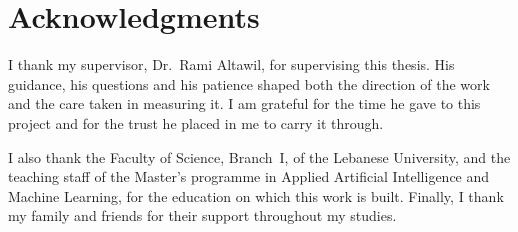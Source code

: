 \chapter*{Acknowledgments}

I thank my supervisor, Dr.~Rami Altawil, for supervising this thesis. His guidance, his questions and his
patience shaped both the direction of the work and the care taken in measuring it. I am grateful for the time he gave
to this project and for the trust he placed in me to carry it through.

I also thank the Faculty of Science, Branch~I, of the Lebanese University, and the teaching staff of the Master's
programme in Applied Artificial Intelligence and Machine Learning, for the education on which this work is built.
Finally, I thank my family and friends for their support throughout my studies.
